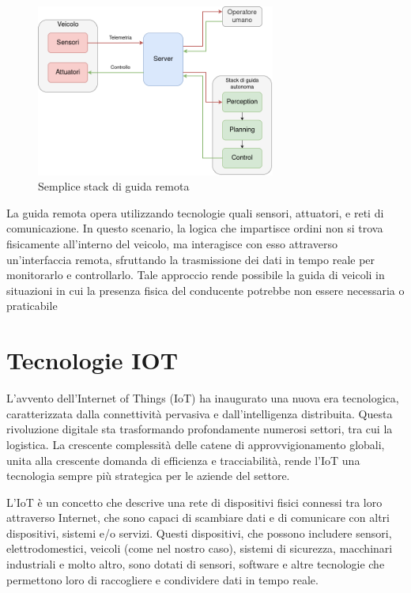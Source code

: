 \begin{figure}[H]
  \centering
  \includegraphics[width=0.7\textwidth]{figures/guida_remota.png}
  \caption{Semplice stack di guida remota}
  \label{guida_remota}
\end{figure}

\noindent La guida remota opera utilizzando tecnologie quali sensori, attuatori, e reti di comunicazione. In questo scenario, la logica che impartisce ordini non si trova fisicamente all'interno del veicolo, ma interagisce con esso attraverso un'interfaccia remota, sfruttando la trasmissione dei dati in tempo reale per monitorarlo e controllarlo. Tale approccio rende possibile la guida di veicoli in situazioni in cui la presenza fisica del conducente potrebbe non essere necessaria o praticabile

\section{Tecnologie IOT}
L'avvento dell'Internet of Things (IoT) ha inaugurato una nuova era tecnologica, caratterizzata dalla connettività pervasiva e dall'intelligenza distribuita. Questa rivoluzione digitale sta trasformando profondamente numerosi settori, tra cui la logistica. La crescente complessità delle catene di approvvigionamento globali, unita alla crescente domanda di efficienza e tracciabilità, rende l'IoT una tecnologia sempre più strategica per le aziende del settore.

\noindent L'IoT è un concetto che descrive una rete di dispositivi fisici connessi tra loro attraverso Internet, che sono capaci di scambiare dati e di comunicare con altri dispositivi, sistemi e/o servizi. Questi dispositivi, che possono includere sensori, elettrodomestici, veicoli (come nel nostro caso), sistemi di sicurezza, macchinari industriali e molto altro, sono dotati di sensori, software e altre tecnologie che permettono loro di raccogliere e condividere dati in tempo reale.

